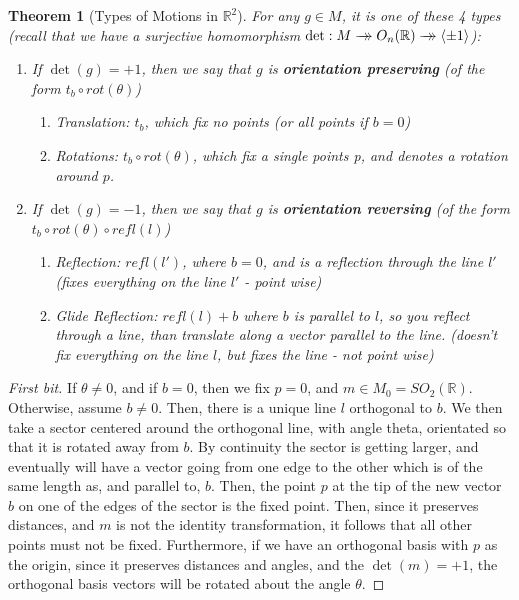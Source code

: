 \documentclass[12pt]{article}
\newtheorem{thm}{Theorem}[section]
\theoremstyle{definition}
\theoremstyle{remark}
\numberwithin{equation}{section}
\newcommand\R{\mathbb R}    %
\newcommand\B[1]{\textbf{ #1}}
\newcommand{\surrightarrow}{\rightarrow\mathrel{\mkern-14mu}\rightarrow}
\begin{document}
\begin{thm}[Types of Motions in $\R^2$]
        For any $g \in M$, it is one of these 4 types (recall that we have a surjective homomorphism $\det: M \surrightarrow O_n(\R) \surrightarrow \langle \pm 1\rangle$): \begin{enumerate}
                \item If $\det(g) = +1$, then we say that $g$ is \B{orientation preserving} (of the form $t_b\circ rot(\theta)$) \begin{enumerate}
                                \item Translation: $t_b$, which fix no points (or all points if $b = 0$)
                                \item Rotations: $t_b\circ rot(\theta)$, which fix a single points p, and denotes a rotation around $p$.
                \end{enumerate}
        \item If $\det(g) = -1$, then we say that $g$ is \B{orientation reversing} (of the form $t_b \circ rot(\theta) \circ refl(l)$) \begin{enumerate}
                        \item Reflection: $refl(l')$, where $b = 0$, and is a reflection through the line $l'$ (fixes everything on the line $l'$ - point wise)
                        \item Glide Reflection: $refl(l) + b$ where $b$ is parallel to $l$, so you reflect through a line, than translate along a vector parallel to the line. (doesn't fix everything on the line $l$, but fixes the line - not point wise)
        \end{enumerate}
        \end{enumerate}
\end{thm}

\begin{proof}
        [First bit] If $\theta \neq 0$, and if $b = 0$, then we fix $p = 0$, and $m \in M_0 = SO_2(\R)$. Otherwise, assume $b \neq 0$. Then, there is a unique line $l$ orthogonal to $b$. We then take a sector centered around the orthogonal line, with angle theta, orientated so that it is rotated away from $b$. By continuity the sector is getting larger, and eventually will have a vector going from one edge to the other which is of the same length as, and parallel to, $b$. Then, the point $p$ at the tip of the new vector $b$ on one of the edges of the sector is the fixed point. Then, since it preserves distances, and $m$ is not the identity transformation, it follows that all other points must not be fixed. Furthermore, if we have an orthogonal basis with $p$ as the origin, since it preserves distances and angles, and the $\det(m) = +1$, the orthogonal basis vectors will be rotated about the angle $\theta$.
\end{proof}
\end{document}
